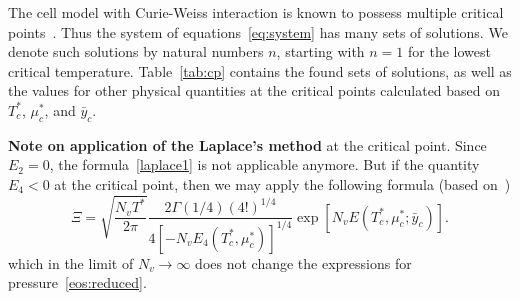 \documentclass[12pt]{article}
\numberwithin{equation}{section}
\begin{document}
	The cell model with Curie-Weiss interaction is known to possess multiple critical points~\cite{KKD18,KKD20,KD22}. Thus the system of equations~\eqref{eq:system} has many sets of solutions. We denote such solutions by natural numbers $n$, starting with $n=1$ for the lowest critical temperature. Table~\ref{tab:cp} contains the found sets of solutions, as well as the values for other physical quantities at the critical points calculated based on $T^*_c$, $\mu^*_c$, and $\bar{y}_c$.
	
	\textbf{Note on application of the Laplace's method} at the critical point. Since $E_2 = 0$, the formula~\eqref{laplace1} is not applicable anymore. But if the quantity $E_4 < 0$ at the critical point, then we may apply the following formula (based on~\cite[6.4.19d]{BenderOrszag99})
	\begin{equation}
		\Xi = \sqrt{\frac{N_v T^*}{2\pi}} \frac{2\Gamma(1/4) (4!)^{1/4}}{4[-N_v E_4(T^*_c,\mu^*_c)]^{1/4}} \exp[N_v E(T^*_c,\mu^*_c; \bar{y}_c)].
	\end{equation}
	which in the limit of $N_v \to \infty$ does not change the expressions for pressure~\eqref{eos:reduced}.
	
\end{document}
